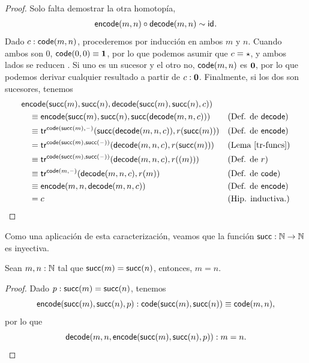 \documentclass[../main.tex]{subfiles}
\begin{document}
\begin{proof}
  Solo falta demostrar la otra homotop\'ia,
  \[ \mathsf{encode}(m,n) \circ \mathsf{decode}(m,n) \sim \mathsf{id}_{}. \]
  Dado $c: \mathsf{code}(m,n)$, procederemos por inducción en ambos $m$ y $n$.
  Cuando ambos son 0, $\mathsf{code}(0,0)\equiv \mathbf{1}$, por lo que podemos asumir que $c \equiv \star$, y ambos lados se reducen \star.
  Si uno es un sucesor y el otro no, $\mathsf{code}(m,n)$ es $\mathbf{0}$, por lo que podemos derivar cualquier resultado a partir de $c : \mathbf{0}$.
  Finalmente, si los dos son sucesores, tenemos
  \begin{align*}
    \mathsf{en} & \mathsf{code} (\mathsf{succ}(m), \mathsf{succ}(n),\mathsf{decode}(\mathsf{succ}(m),\mathsf{succ}(n),c))               &  &                              \\
                & \equiv \mathsf{encode}(\mathsf{succ}(m),\mathsf{succ}(n),{\mathsf{succ}}(\mathsf{decode}(m,n,c)))                     &  & \text{(Def. de \ensuremath{\mathsf{decode}})}     \\
                & \equiv \mathsf{tr}^{\mathsf{code}(\mathsf{succ}(m),{\mathord{\hspace{1pt}\text{--}\hspace{1pt}}})}({\mathsf{succ}}(\mathsf{decode}(m,n,c)),r(\mathsf{succ}(m))) &  & \text{(Def. de \ensuremath{\mathsf{encode}})}     \\
                & = \mathsf{tr}^{\mathsf{code}(\mathsf{succ}(m),\mathsf{succ}({\mathord{\hspace{1pt}\text{--}\hspace{1pt}}}))}(\mathsf{decode}(m,n,c),r(\mathsf{succ}(m)))       &  & \text{(Lema \ref{tr-funcs})} \\
                & \equiv \mathsf{tr}^{\mathsf{code}(\mathsf{succ}(m),\mathsf{succ}({\mathord{\hspace{1pt}\text{--}\hspace{1pt}}}))}(\mathsf{decode}(m,n,c),r((m)))       &  & \text{(Def. de $r$)}         \\
                & \equiv \mathsf{tr}^{\mathsf{code}(m,{\mathord{\hspace{1pt}\text{--}\hspace{1pt}}})}(\mathsf{decode}(m,n,c),r(m))                     &  & \text{(Def. de \ensuremath{\mathsf{code}})}       \\
                & \equiv \mathsf{encode}(m,n,\mathsf{decode}(m,n,c))                                         &  & \text{(Def. de \ensuremath{\mathsf{encode}})}     \\
                & = c                                                                       &  & \text{(Hip. inductiva.)}
  \end{align*}
\end{proof}

Como una aplicaci\'on de esta caracterizaci\'on, veamos que la funci\'on $\mathsf{succ}: \mathbb{N} \to \mathbb{N}$ es inyectiva.
\begin{corollary}
  Sean $m,n: \mathbb{N}$ tal que $\mathsf{succ}(m)=\mathsf{succ}(n)$, entonces, $m=n$.
\end{corollary}
\begin{proof}
  Dado $p:\mathsf{succ}(m)=\mathsf{succ}(n)$, tenemos
  \[ \mathsf{encode}(\mathsf{succ}(m),\mathsf{succ}(n),p): \mathsf{code}(\mathsf{succ}(m),\mathsf{succ}(n)) \equiv \mathsf{code}(m,n), \]
  por lo que
  \[ \mathsf{decode}(m, n, \mathsf{encode}(\mathsf{succ}(m),\mathsf{succ}(n),p)) : m=n. \]
\end{proof}
\end{document}
